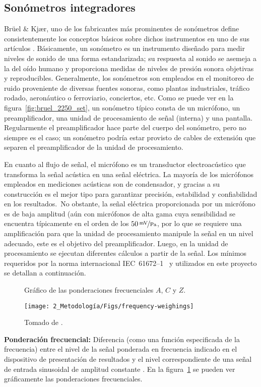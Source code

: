 \subsection{Sonómetros integradores}
Brüel \& Kjær, uno de los fabricantes más prominentes de sonómetros define consistentemente los conceptos básicos sobre dichos instrumentos en uno de sus artículos .
Básicamente, un sonómetro es un instrumento diseñado para medir niveles de sonido de una forma estandarizada;
su respuesta al sonido se asemeja a la del oído humano y proporciona medidas de niveles de presión sonora objetivas y reproducibles.
Generalmente, los sonómetros son empleados en el monitoreo de ruido proveniente de diversas fuentes sonoras, como plantas industriales, tráfico rodado, aeronáutico o ferroviario, conciertos, etc.
Como se puede ver en la figura~\ref{fig:bruel_2250_set}, un sonómetro típico consta de un micrófono, un preamplificador, una unidad de procesamiento de señal (interna) y una pantalla.
Regularmente el preamplificador hace parte del cuerpo del sonómetro, pero no siempre es el caso;
un sonómetro podría estar provisto de cables de extensión que separen el preamplificador de la unidad de procesamiento.

En cuanto al flujo de señal, el micrófono es un transductor electroacústico que transforma la señal acústica en una señal eléctrica.
La mayoría de los micrófonos empleados en mediciones acústicas son de condensador, y gracias a su construcción es el mejor tipo para garantizar precisión, estabilidad y confiabilidad en los resultados.\ No obstante, la señal eléctrica proporcionada por un micrófono es de baja amplitud (aún con micrófonos de alta gama cuya sensibilidad se encuentra típicamente en el orden de los $50\,\nicefrac{\unit{\mV}}{\unit{\Pa}}$, por lo que se requiere una amplificación para que la unidad de procesamiento manipule la señal en un nivel adecuado, este es el objetivo del preamplificador.
Luego, en la unidad de procesamiento se ejecutan diferentes cálculos a partir de la señal.
Los mínimos requeridos por la norma internacional \mbox{IEC 61672--1}~\citeyearpar{IEC_TC29_2013_1} y utilizados en este proyecto se detallan a continuación.

\begin{figure}[!h]
    \caption{Gráfico de las ponderaciones frecuenciales $A$, $C$ y $Z$.}
    \label{fig:frequency_weightings}
    \centering
    \texttt{[image: 2\_Metodología/Figs/frequency-weighings]}
    \caption*{\footnotesize Tomado de .}
\end{figure}
%
\textbf{Ponderación frecuencial:} Diferencia (como una función especificada de la frecuencia) entre el nivel de la señal ponderada en frecuencia indicado en el dispositivo de presentación de resultados y el nivel correspondiente de una señal de entrada sinusoidal de amplitud constante .
En la figura~\ref{fig:frequency_weightings} se pueden ver gráficamente las ponderaciones frecuenciales.

